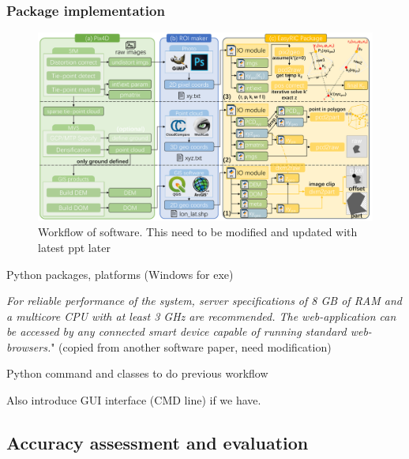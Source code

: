 \documentclass[sensors,article,submit,moreauthors, xelatex]{Definitions/mdpi}
\begin{document}
\subsubsection{Package implementation}

\begin{figure}[H]
  \centering
  \includegraphics[width=0.95\linewidth]{figures/workflow.pdf}
  \caption{Workflow of software. This need to be modified and updated with latest ppt later}
  \label{fig:workflow}
\end{figure}


Python packages, platforms (Windows for exe)

\textit{For reliable performance of the system, server specifications of 8 GB of RAM and a multicore CPU with at least 3 GHz are recommended. The web-application can be accessed by any connected smart device capable of
running standard web-browsers.}" (copied from another software paper, need modification)

Python command and classes to do previous workflow

Also introduce GUI interface (CMD line) if we have.

\subsection{Accuracy assessment and evaluation}
\end{document}
